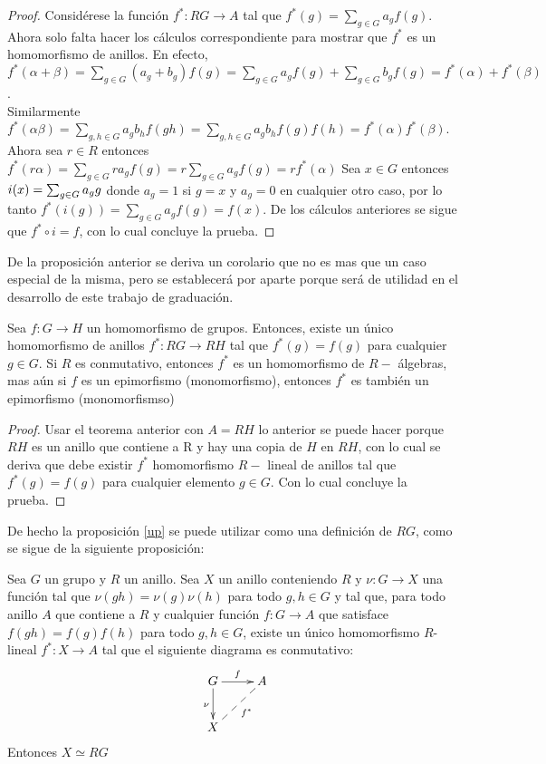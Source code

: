 \begin{proof}
Considérese la función $f^* \colon RG \to A$ tal que $f^*(g)=\sum_{g\in G}a_gf(g)$. Ahora solo falta hacer los cálculos correspondiente para mostrar que $f^*$ es un homomorfismo de anillos. En efecto, $f^*(\alpha + \beta ) = \sum_{g \in G}(a_g + b_g)f(g) = \sum_{g \in G}a_gf(g) + \sum_{g \in G}b_gf(g) = f^*(\alpha) + f^*(\beta) $. \\ 
Similarmente $f^*(\alpha\beta)=\sum_{g,h\in G}a_gb_hf(gh)= \sum_{g,h\in G}a_gb_hf(g)f(h) = f^*(\alpha)f^*(\beta)$. Ahora sea $r \in R$ entonces $f^*(r\alpha)=\sum_{g\in G}ra_gf(g)=r\sum_{g\in G}a_gf(g)=rf^*(\alpha)$
Sea $x \in G$ entonces $i(x) = \sum_{g \in G} a_{g} g$ donde $a_g = 1$ si $g = x$ y $a_g= 0$ en cualquier otro caso, por lo tanto $f^*(i(g))= \sum_{g \in G} a_gf(g)=f(x)$. De los cálculos anteriores se sigue que $f^*\circ i = f$, con lo cual concluye la prueba. 
\qedhere
\end{proof}

De la proposición anterior se deriva un corolario que no es mas que un caso especial de la misma,  pero se establecerá por aparte porque será de utilidad en el desarrollo de este trabajo de graduación.

\begin{corolario}\label{aumento}
Sea $f \colon G \to H$ un homomorfismo de grupos. Entonces, existe un único homomorfismo de anillos $f^* \colon RG \to RH$ tal que $f^*(g) = f(g)$ para cualquier $g \in G$. Si $R$ es conmutativo, entonces $f^*$ es un homomorfismo de $R-$ álgebras, mas aún si $f$ es un epimorfismo (monomorfismo), entonces $f^*$ es también un epimorfismo (monomorfismso)
\end{corolario}

\begin{proof}
Usar el teorema anterior con $A=RH$ lo anterior se puede hacer porque $RH$ es un anillo que contiene a R y hay una copia de $H$ en $RH$, con lo cual se deriva que debe existir $f^*$ homomorfismo $R-$ lineal de anillos tal que $f^*(g)=f(g)$ para cualquier elemento $g \in G$. Con lo cual concluye la prueba.
\qedhere
\end{proof}




De hecho la proposición \ref{up} se puede utilizar como una definición de $RG$, como se sigue de la siguiente proposición:

\begin{proposicion}
Sea $G$ un grupo y $R$ un anillo. Sea $X$ un anillo conteniendo $R$ y $\nu \colon G \to X$ una función tal que $\nu (gh) = \nu(g)\nu(h)$ para todo $g,h \in G$ y tal que, para todo anillo $A$ que contiene a $R$ y cualquier función $f \colon G \to A$ que satisface $f(gh) = f(g)f(h)$ para todo $g, h \in G$, existe un único homomorfismo $R$-lineal $f^* \colon X \to A$ tal que el siguiente diagrama es conmutativo: 
\[\xymatrix { G \ar[r]^f 
\ar[d]_{\nu}
 & A\\
X \ar@{ --}[ru]_{f^*} & }\]
Entonces $X \simeq RG$
\end{proposicion}



